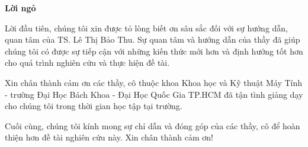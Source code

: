 \centerline{{\bfseries \LARGE Lời ngỏ}}

\bigskip
\bigskip

Lời đầu tiên, chúng tôi xin được tỏ lòng biết ơn sâu sắc đối với sự hướng
dẫn, quan tâm của TS. Lê Thị Bảo Thu. Sự quan tâm và hướng dẫn của thầy
đã giúp chúng tôi có được sự tiếp cận với những kiến thức mới hơn và định
hướng tốt hơn cho quá trình nghiên cứu và thực hiện đề tài.\par
Xin chân thành cảm ơn các thầy, cô thuộc khoa Khoa học và Kỹ thuật Máy
Tính - trường Đại Học Bách Khoa - Đại Học Quốc Gia TP.HCM đã tận tình
giảng dạy cho chúng tôi trong thời gian học tập tại trường.\par
Cuối cùng, chúng tôi kính mong sự chỉ dẫn và đóng góp của các thầy, cô để
hoàn thiện hơn đề tài nghiên cứu này. Xin chân thành cảm ơn!